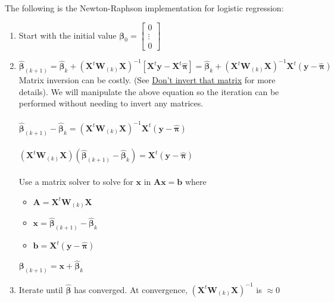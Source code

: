 \documentclass{article}
\begin{document}
\noindent The following is the Newton-Raphson implementation for logistic regression:
\begin{enumerate}
    \item Start with the initial value $\boldsymbol{\beta}_0 = \begin{bmatrix} 
    0 \\
    \vdots \\
    0
    \end{bmatrix}$
    \item $\boldsymbol{\hat{\beta}}_{(k+1)} = \boldsymbol{\hat{\beta}}_{k} + (\boldsymbol{X}^t \boldsymbol{W}_{(k)} \boldsymbol{X})^{-1}[\boldsymbol{X}^t\boldsymbol{y} - \boldsymbol{X}^t\boldsymbol{\hat{\pi}}] = \boldsymbol{\hat{\beta}}_{k} + (\boldsymbol{X}^t \boldsymbol{W}_{(k)} \boldsymbol{X})^{-1}\boldsymbol{X}^t(\boldsymbol{y - \hat{\pi}})$
    \\
    Matrix inversion can be costly. (See \href{https://www.johndcook.com/blog/2010/01/19/dont-invert-that-matrix/}{Don't invert that matrix} for more details). We will manipulate the above equation so the iteration can be performed without needing to invert any matrices.
    \\\\
    $\boldsymbol{\hat{\beta}}_{(k+1)} - \boldsymbol{\hat{\beta}}_{k} = (\boldsymbol{X}^t \boldsymbol{W}_{(k)} \boldsymbol{X})^{-1}\boldsymbol{X}^t(\boldsymbol{y - \hat{\pi}})$
    \\\\
    $(\boldsymbol{X}^t \boldsymbol{W}_{(k)} \boldsymbol{X})(\boldsymbol{\hat{\beta}}_{(k+1)} - \boldsymbol{\hat{\beta}}_{k}) = \boldsymbol{X}^t(\boldsymbol{y - \hat{\pi}})$
    \\\\
    Use a matrix solver to solve for $\boldsymbol{x}$ in $\boldsymbol{Ax} = \boldsymbol{b}$ where 
    \begin{itemize}
    \item $\boldsymbol{A} = \boldsymbol{X}^t \boldsymbol{W}_{(k)} \boldsymbol{X}$
    \item $\boldsymbol{x} = \boldsymbol{\hat{\beta}}_{(k+1)} - \boldsymbol{\hat{\beta}}_{k}$
    \item $\boldsymbol{b} = \boldsymbol{X}^t(\boldsymbol{y - \hat{\pi}})$
    \end{itemize}
    
    $\boldsymbol{\beta}_{(k+1)} = \boldsymbol{x} + \boldsymbol{\hat{\beta}}_{k}$
    
    \item Iterate until $\boldsymbol{\hat{\beta}}$ has converged. At convergence, $(\boldsymbol{X}^t \boldsymbol{W}_{(k)} \boldsymbol{X})^{-1}$ is $\approx 0$
\end{enumerate}
\end{document}
